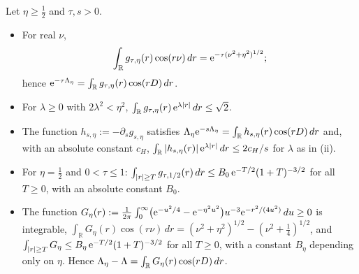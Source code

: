 \begin{lemma}\label{os:prof}
Let $\eta\ge\tfrac12$ and $\tau,s>0$.
\begin{itemize}
\item[(i)] For real $\nu$,
\[
\int_{\mathbb R}g_{\tau,\eta}(r)\cos(r\nu)\,dr=\mathrm{e}^{-\tau(\nu^2+\eta^2)^{1/2}};
\]
hence $\mathrm{e}^{-\tau\Lambda_\eta}=\int_{\mathbb R}g_{\tau,\eta}(r)\cos(rD)\,dr$.
\item[(ii)] For $\lambda\ge0$ with $2\lambda^2<\eta^2$, $\int_{\mathbb R}g_{\tau,\eta}(r)\,\mathrm{e}^{\lambda|r|}\,dr\le\sqrt2$.
\item[(iii)] The function $h_{s,\eta}:=-\partial_sg_{s,\eta}$ satisfies $\Lambda_\eta\mathrm{e}^{-s\Lambda_\eta}=\int_{\mathbb R}h_{s,\eta}(r)\cos(rD)\,dr$ and,
with an absolute constant $c_H$, $\int_{\mathbb R}|h_{s,\eta}(r)|\,\mathrm{e}^{\lambda|r|}\,dr\le2c_H/s$ for $\lambda$ as in (ii).
\item[(iv)] For $\eta=\tfrac12$ and $0<\tau\le1$: $\int_{|r|\ge T}g_{\tau,1/2}(r)\,dr\le B_0\,\mathrm{e}^{-T/2}(1+T)^{-3/2}$ for all $T\ge0$, with
an absolute constant $B_0$.
\item[(v)] The function $G_\eta(r):=\frac1{2\pi}\int_0^\infty\bigl(\mathrm{e}^{-u^2/4}-\mathrm{e}^{-\eta^2u^2}\bigr)u^{-3}\mathrm{e}^{-r^2/(4u^2)}\,du\ge0$ is integrable,
$\int_{\mathbb R}G_\eta(r)\cos(r\nu)\,dr=(\nu^2+\eta^2)^{1/2}-(\nu^2+\tfrac14)^{1/2}$, and
$\int_{|r|\ge T}G_\eta\le B_\eta\,\mathrm{e}^{-T/2}(1+T)^{-3/2}$ for all $T\ge0$, with a constant $B_\eta$ depending only on $\eta$.
Hence $\Lambda_\eta-\Lambda=\int_{\mathbb R}G_\eta(r)\cos(rD)\,dr$.
\end{itemize}
\end{lemma}
